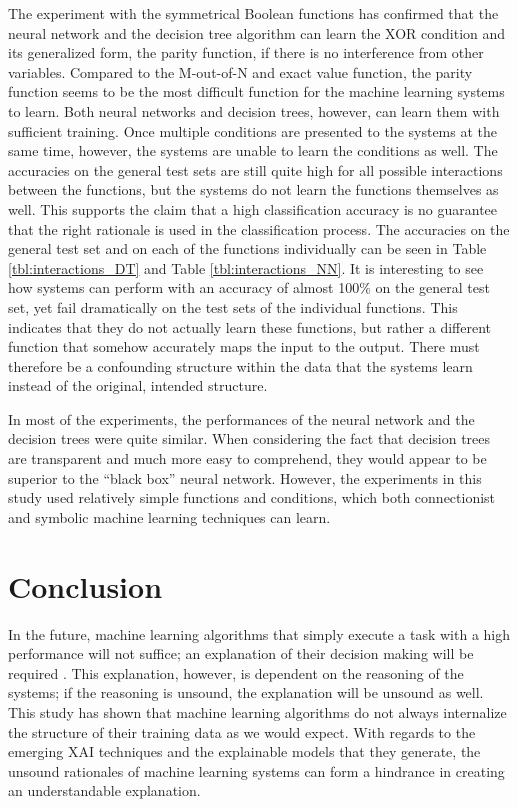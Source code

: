 \documentclass[letterpaper]{article} %
\begin{document}
The experiment with the symmetrical Boolean functions has confirmed that the neural network and the decision tree algorithm can learn the XOR condition and its generalized form, the parity function, if there is no interference from other variables. Compared to the M-out-of-N and exact value function, the parity function seems to be the most difficult function for the machine learning systems to learn. Both neural networks and decision trees, however, can learn them with sufficient training. Once multiple conditions are presented to the systems at the same time, however, the systems are unable to learn the conditions as well. The accuracies on the general test sets are still quite high for all possible interactions between the functions, but the systems do not learn the functions themselves as well. This supports the claim that a high classification accuracy is no guarantee that the right rationale is used in the classification process. The accuracies on the general test set and on each of the functions individually can be seen in Table \ref{tbl:interactions_DT} and Table \ref{tbl:interactions_NN}. It is interesting to see how systems can perform with an accuracy of almost 100\% on the general test set, yet fail dramatically on the test sets of the individual functions. This indicates that they do not actually learn these functions, but rather a different function that somehow accurately maps the input to the output. There must therefore be a confounding structure within the data that the systems learn instead of the original, intended structure. 

In most of the experiments, the performances of the neural network and the decision trees were quite similar. When considering the fact that decision trees are transparent and much more easy to comprehend, they would appear to be superior to the ``black box''  neural network. However, the experiments in this study used relatively simple functions and conditions, which both connectionist and symbolic machine learning techniques can learn. %

\section{Conclusion}
\noindent In the future, machine learning algorithms that simply execute a task with a high performance will not suffice; an explanation of their decision making will be required \cite{gunning2017explainable}. This explanation, however, is dependent on the reasoning of the systems; if the reasoning is unsound, the explanation will be unsound as well. This study has shown that machine learning algorithms do not always internalize the structure of their training data as we would expect. With regards to the emerging XAI techniques and the explainable models that they generate, the unsound rationales of machine learning systems can form a hindrance in creating an understandable explanation. 




\end{document}
